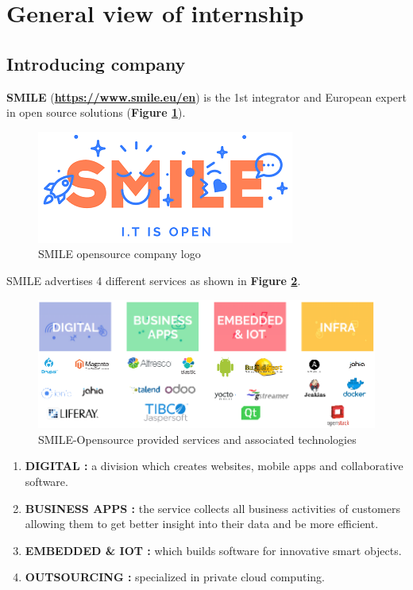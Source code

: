 \section{General view of internship}

\subsection{Introducing company}
\textbf{SMILE} (\textbf{\color{blue}\url{https://www.smile.eu/en}}) is the 1st integrator and European expert in open source solutions (\textbf{Figure \ref{SMILE opensource company}}). 

			\begin{figure}[H]
					\centering
        			\includegraphics[scale=0.55]{img/smile.png}
        			\caption{SMILE opensource company logo}
        			\label{SMILE opensource company}
   			 \end{figure}

SMILE advertises 4 different services as shown in \textbf{Figure \ref{SMILE opensource services and associated opensource technologies}}.
			\begin{figure}[H]
					\centering
        			\includegraphics[scale=0.55]{img/smile-services-technologies.png}
        			\caption{SMILE-Opensource provided services and associated technologies}
        			\label{SMILE opensource services and associated opensource technologies}
   			 \end{figure}


\begin{enumerate}
	\item \textbf{DIGITAL : } a division which creates websites, mobile apps and collaborative software. 
	\item \textbf{BUSINESS APPS : } the service collects all business activities of customers allowing them to get better insight into their data and be more efficient. 
	\item \textbf{EMBEDDED \& IOT : } which builds software for innovative smart objects.
	\item \textbf{OUTSOURCING : } specialized in private cloud computing. 
\end{enumerate}



